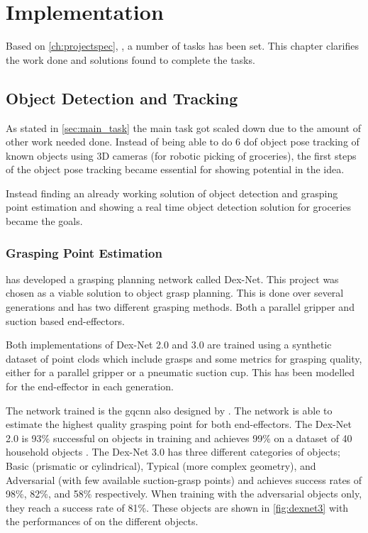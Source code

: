 \chapter{Implementation}\label{ch:implementation}\glsresetall
Based on \autoref{ch:projectspec}, , a number of tasks has been set. This chapter clarifies the work done and solutions found to complete the tasks.

\section{Object Detection and Tracking}
As stated in \autoref{sec:main_task} the main task got scaled down due to the amount of other work needed done. Instead of being able to do 6 \gls{dof} object pose tracking of known objects using 3D cameras (for robotic picking of groceries), the first steps of the object pose tracking became essential for showing potential in the idea. 

Instead finding an already working solution of object detection and grasping point estimation and showing a real time object detection solution for groceries became the goals.

\subsection{Grasping Point Estimation}
\cite{Dexnet3} has developed a grasping planning network called Dex-Net. This project was chosen as a viable solution to object grasp planning. This is done over several generations and has two different grasping methods. Both a parallel gripper and suction based end-effectors.

Both implementations of Dex-Net 2.0 and 3.0 are trained using a synthetic dataset of point clods which include grasps and some metrics for grasping quality, either for a parallel gripper or a pneumatic suction cup. This has been modelled for the end-effector in each generation.

The network trained is the \gls{gqcnn} also designed by \cite{Mahler2017}. The network is able to estimate the highest quality grasping point for both end-effectors. The Dex-Net 2.0 is 93\% successful on objects in training and achieves 99\% on a dataset of 40 household objects \citep{Mahler2017}. The Dex-Net 3.0 has three different categories of objects; Basic (prismatic or cylindrical), Typical (more complex geometry), and Adversarial (with few available suction-grasp points) and achieves success rates of 98\%, 82\%, and 58\% respectively. When training with the adversarial objects only, they reach a success rate of 81\%. These objects are shown in \autoref{fig:dexnet3} with the performances of on the different objects.

